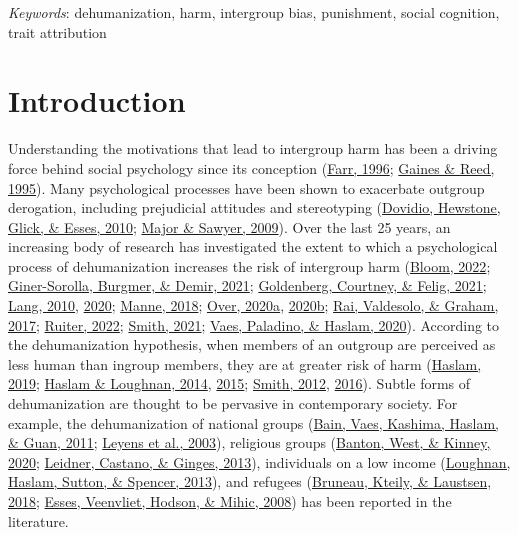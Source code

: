 \documentclass[
]{article}
\begin{document}
\emph{Keywords}: dehumanization, harm, intergroup bias, punishment, social cognition, trait attribution

\hypertarget{introduction}{%
\section{Introduction}\label{introduction}}

Understanding the motivations that lead to intergroup harm has been a driving force behind social psychology since its conception (\protect\hyperlink{ref-Farr1996}{Farr, 1996}; \protect\hyperlink{ref-Gaines1995}{Gaines \& Reed, 1995}). Many psychological processes have been shown to exacerbate outgroup derogation, including prejudicial attitudes and stereotyping (\protect\hyperlink{ref-Dovidio2010}{Dovidio, Hewstone, Glick, \& Esses, 2010}; \protect\hyperlink{ref-Major2009}{Major \& Sawyer, 2009}). Over the last 25 years, an increasing body of research has investigated the extent to which a psychological process of dehumanization increases the risk of intergroup harm (\protect\hyperlink{ref-Bloom2022}{Bloom, 2022}; \protect\hyperlink{ref-Giner-Sorolla2021}{Giner-Sorolla, Burgmer, \& Demir, 2021}; \protect\hyperlink{ref-Goldenberg2021}{Goldenberg, Courtney, \& Felig, 2021}; \protect\hyperlink{ref-Lang2010}{Lang, 2010}, \protect\hyperlink{ref-Lang2020}{2020}; \protect\hyperlink{ref-Manne2018}{Manne, 2018}; \protect\hyperlink{ref-Over2020a}{Over, 2020a}, \protect\hyperlink{ref-Over2020b}{2020b}; \protect\hyperlink{ref-Rai2017}{Rai, Valdesolo, \& Graham, 2017}; \protect\hyperlink{ref-Ruiter2022}{Ruiter, 2022}; \protect\hyperlink{ref-Smith2021}{Smith, 2021}; \protect\hyperlink{ref-Vaes2020}{Vaes, Paladino, \& Haslam, 2020}). According to the dehumanization hypothesis, when members of an outgroup are perceived as less human than ingroup members, they are at greater risk of harm (\protect\hyperlink{ref-Haslam2019}{Haslam, 2019}; \protect\hyperlink{ref-Haslam2014}{Haslam \& Loughnan, 2014}, \protect\hyperlink{ref-Haslam2015}{2015}; \protect\hyperlink{ref-Smith2011}{Smith, 2012}, \protect\hyperlink{ref-Smith2016}{2016}). Subtle forms of dehumanization are thought to be pervasive in contemporary society. For example, the dehumanization of national groups (\protect\hyperlink{ref-Bain2011}{Bain, Vaes, Kashima, Haslam, \& Guan, 2011}; \protect\hyperlink{ref-Leyens2003}{Leyens et al., 2003}), religious groups (\protect\hyperlink{ref-Banton2020}{Banton, West, \& Kinney, 2020}; \protect\hyperlink{ref-Leidner2013}{Leidner, Castano, \& Ginges, 2013}), individuals on a low income (\protect\hyperlink{ref-Loughnan2013}{Loughnan, Haslam, Sutton, \& Spencer, 2013}), and refugees (\protect\hyperlink{ref-Bruneau2018}{Bruneau, Kteily, \& Laustsen, 2018}; \protect\hyperlink{ref-Esses2008}{Esses, Veenvliet, Hodson, \& Mihic, 2008}) has been reported in the literature.
\end{document}
